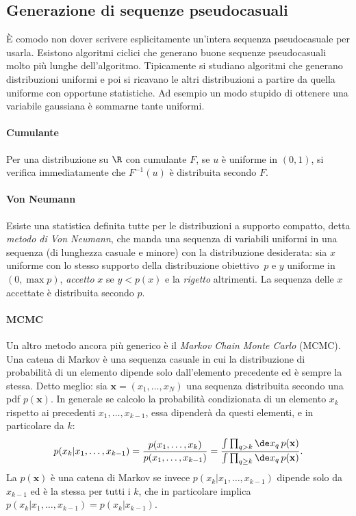 \subsection{Generazione di sequenze pseudocasuali}

È comodo non dover scrivere esplicitamente un'intera sequenza pseudocasuale per
usarla. Esistono algoritmi ciclici che generano buone sequenze pseudocasuali
molto più lunghe dell'algoritmo. Tipicamente si studiano algoritmi che generano
distribuzioni uniformi e poi si ricavano le altri distribuzioni a partire da
quella uniforme con opportune statistiche. Ad esempio un modo stupido di
ottenere una variabile gaussiana è sommarne tante uniformi.

\paragraph{Cumulante}

Per una distribuzione su $\R$ con cumulante $F$,
se $u$ è uniforme in $(0,1)$,
si verifica immediatamente che $F^{-1}(u)$ è distribuita secondo $F$.

\paragraph{Von Neumann}

Esiste una statistica definita tutte per le distribuzioni a supporto compatto,
detta \emph{metodo di Von Neumann},
che manda una sequenza di variabili uniformi in una sequenza (di lunghezza casuale e minore) con la distribuzione desiderata:
sia $x$ uniforme con lo stesso supporto della distribuzione obiettivo~$p$
e $y$ uniforme in $(0,\max p)$, \emph{accetto} $x$ se $y<p(x)$ e la \emph{rigetto} altrimenti.
La sequenza delle $x$ accettate è distribuita secondo $p$.

\paragraph{MCMC}

Un altro metodo ancora più generico è il \emph{Markov Chain Monte Carlo}
(MCMC). Una catena di Markov è una sequenza casuale in cui la distribuzione di
probabilità di un elemento dipende solo dall'elemento precedente ed è sempre la
stessa. Detto meglio: sia $\mathbf x = (x_1,\dots,x_N)$ una sequenza
distribuita secondo una pdf $p(\mathbf x)$. In generale se calcolo la
probabilità condizionata di un elemento $x_k$ rispetto ai precedenti $x_1,
\dots, x_{k-1}$, essa dipenderà da questi elementi, e in particolare da $k$:
\begin{equation}
    p(x_k|x_1,\ldots,x_{k-1})
    = \frac {p(x_1,\ldots,x_k)} {p(x_1,\ldots,x_{k-1})}
    = \frac
    {\int \prod_{q > k} \de x_q\, p(\mathbf x)}
    {\int \prod_{q \ge k} \de x_q\, p(\mathbf x)}.
\end{equation}
La $p(\mathbf x)$ è una catena di Markov se invece $p(x_k|x_1,\ldots,x_{k-1})$
dipende solo da $x_{k-1}$ ed è la stessa per tutti i $k$, che in particolare
implica $p(x_k|x_1,\ldots,x_{k-1}) = p(x_k|x_{k-1})$.

